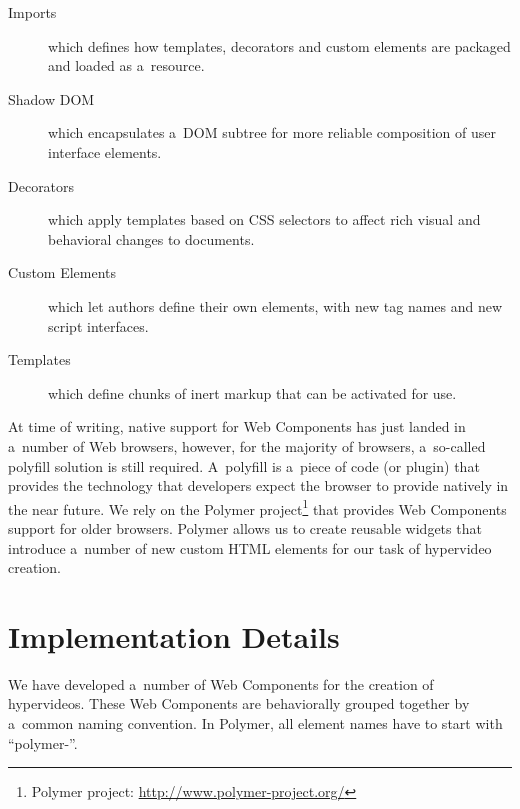 \documentclass[runningheads,a4paper]{llncs}
\begin{document}
\begin{description}
  \item[Imports] which defines how templates, decorators and custom elements are packaged and loaded as a~resource.
  \item[Shadow DOM] which encapsulates a~DOM subtree for more reliable composition of user interface elements.    
  \item[Decorators] which apply templates based on CSS selectors to affect rich visual and behavioral changes to documents.
  \item[Custom Elements] which let authors define their own elements, with new tag names and new script interfaces.
  \item[Templates] which define chunks of inert markup that can be activated for use.  
\end{description}

\noindent At time of writing, native support for Web Components
has just landed in a~number of Web browsers,
however, for the majority of browsers,
a~so-called polyfill solution is still required.
A~polyfill  is a~piece of code (or plugin) that provides the technology
that developers expect the browser to provide natively in the near future.
We rely on the Polymer project\footnote{Polymer project:
\url{http://www.polymer-project.org/}}
that provides Web Components support for older browsers.
Polymer allows us to create reusable widgets that introduce a~number of new
custom HTML elements for our task of hypervideo creation.

\section{Implementation Details}

We have developed a~number of Web Components for the creation of hypervideos.
These Web Components are behaviorally grouped together
by a~common naming convention.
In Polymer, all element names have to start with ``polymer-''.
\end{document}
